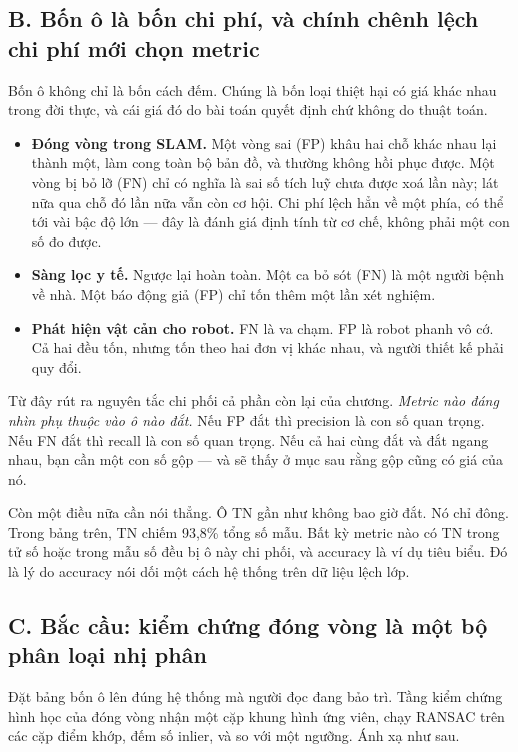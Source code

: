\documentclass[../../deep_learning.tex]{subfiles}
\begin{document}
\subsection{B. Bốn ô là bốn chi phí, và chính chênh lệch chi phí mới chọn metric}
Bốn ô không chỉ là bốn cách đếm. Chúng là bốn loại thiệt hại có giá khác nhau trong đời thực, và cái giá đó do bài toán quyết định chứ không do thuật toán.

\begin{itemize}
\item \textbf{Đóng vòng trong SLAM.} Một vòng sai (FP) khâu hai chỗ khác nhau lại thành một, làm cong toàn bộ bản đồ, và thường không hồi phục được. Một vòng bị bỏ lỡ (FN) chỉ có nghĩa là sai số tích luỹ chưa được xoá lần này; lát nữa qua chỗ đó lần nữa vẫn còn cơ hội. Chi phí lệch hẳn về một phía, có thể tới vài bậc độ lớn --- đây là đánh giá định tính từ cơ chế, không phải một con số đo được.
\item \textbf{Sàng lọc y tế.} Ngược lại hoàn toàn. Một ca bỏ sót (FN) là một người bệnh về nhà. Một báo động giả (FP) chỉ tốn thêm một lần xét nghiệm.
\item \textbf{Phát hiện vật cản cho robot.} FN là va chạm. FP là robot phanh vô cớ. Cả hai đều tốn, nhưng tốn theo hai đơn vị khác nhau, và người thiết kế phải quy đổi.
\end{itemize}

Từ đây rút ra nguyên tắc chi phối cả phần còn lại của chương. \emph{Metric nào đáng nhìn phụ thuộc vào ô nào đắt.} Nếu FP đắt thì precision là con số quan trọng. Nếu FN đắt thì recall là con số quan trọng. Nếu cả hai cùng đắt và đắt ngang nhau, bạn cần một con số gộp --- và sẽ thấy ở mục sau rằng gộp cũng có giá của nó.

Còn một điều nữa cần nói thẳng. Ô TN gần như không bao giờ đắt. Nó chỉ đông. Trong bảng trên, TN chiếm 93{,}8\% tổng số mẫu. Bất kỳ metric nào có TN trong tử số hoặc trong mẫu số đều bị ô này chi phối, và accuracy là ví dụ tiêu biểu. Đó là lý do accuracy nói dối một cách hệ thống trên dữ liệu lệch lớp.

\subsection{C. Bắc cầu: kiểm chứng đóng vòng là một bộ phân loại nhị phân}
Đặt bảng bốn ô lên đúng hệ thống mà người đọc đang bảo trì. Tầng kiểm chứng hình học của đóng vòng nhận một cặp khung hình ứng viên, chạy RANSAC trên các cặp điểm khớp, đếm số inlier, và so với một ngưỡng. Ánh xạ như sau.
\end{document}
